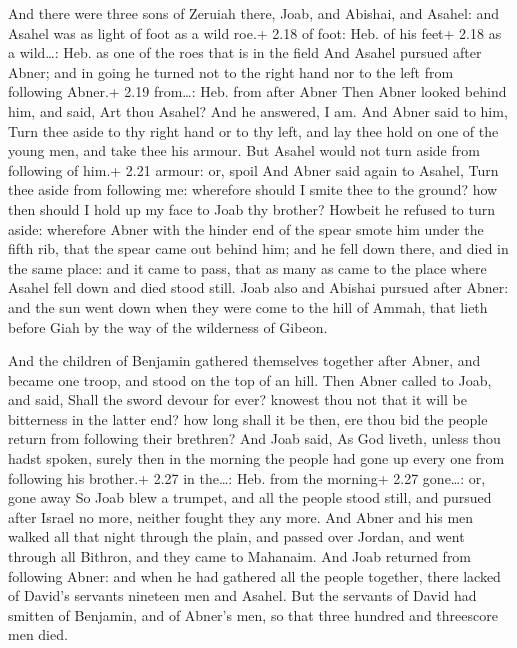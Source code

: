  And there were three sons of Zeruiah there, Joab, and
Abishai, and Asahel: and Asahel was as light of foot as a wild roe.+
2.18 of foot: Heb. of his feet+ 2.18 as a wild\ldots: Heb. as one of the
roes that is in the field  And Asahel pursued after Abner;
and in going he turned not to the right hand nor to the left from
following Abner.+ 2.19 from\ldots: Heb. from after Abner 
Then Abner looked behind him, and said, Art thou Asahel? And he
answered, I am.  And Abner said to him, Turn thee aside to
thy right hand or to thy left, and lay thee hold on one of the young
men, and take thee his armour. But Asahel would not turn aside from
following of him.+ 2.21 armour: or, spoil  And Abner said
again to Asahel, Turn thee aside from following me: wherefore should I
smite thee to the ground? how then should I hold up my face to Joab thy
brother?  Howbeit he refused to turn aside: wherefore Abner
with the hinder end of the spear smote him under the fifth rib, that the
spear came out behind him; and he fell down there, and died in the same
place: and it came to pass, that as many as came to the place where
Asahel fell down and died stood still.  Joab also and
Abishai pursued after Abner: and the sun went down when they were come
to the hill of Ammah, that lieth before Giah by the way of the
wilderness of Gibeon.

 And the children of Benjamin gathered themselves
together after Abner, and became one troop, and stood on the top of an
hill.  Then Abner called to Joab, and said, Shall the sword
devour for ever? knowest thou not that it will be bitterness in the
latter end? how long shall it be then, ere thou bid the people return
from following their brethren?  And Joab said, As God
liveth, unless thou hadst spoken, surely then in the morning the people
had gone up every one from following his brother.+ 2.27 in the\ldots:
Heb. from the morning+ 2.27 gone\ldots: or, gone away  So
Joab blew a trumpet, and all the people stood still, and pursued after
Israel no more, neither fought they any more.  And Abner
and his men walked all that night through the plain, and passed over
Jordan, and went through all Bithron, and they came to Mahanaim.
 And Joab returned from following Abner: and when he had
gathered all the people together, there lacked of David's servants
nineteen men and Asahel.  But the servants of David had
smitten of Benjamin, and of Abner's men, so that three hundred and
threescore men died.

